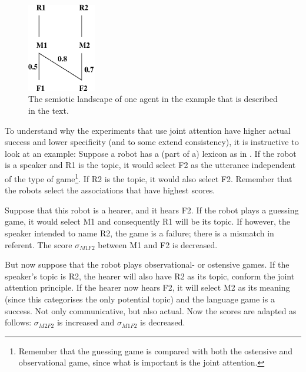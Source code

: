 \begin{figure}[t]
\centerline{\includegraphics[width=3cm]{feedback/example.eps}}
\caption{The semiotic landscape of one agent in the example that is described in the text.}
\label{f:par:example}
\end{figure}


To understand why the experiments that use joint attention have higher actual success and lower specificity (and to some extend consistency), it is instructive to look at an example: Suppose a robot has a (part of a) lexicon as in . If the robot is a speaker and R1 is the topic, it would select F2 as the utterance independent of the type of game\footnote{Remember that the guessing game is compared with both the ostensive and observational game, since what is important is the joint attention.}. If R2 is the topic, it would also select F2. Remember that the robots select the associations that have highest scores.

Suppose that this robot is a hearer, and it hears F2. If the robot plays a guessing game, it would select M1 and consequently R1 will be its topic. If however, the speaker intended to name R2, the game is a failure; there is a mismatch in referent. The score $\sigma_{M1F2}$ between M1 and F2 is decreased.

But now suppose that the robot plays observational- or ostensive games. If the speaker's topic is R2, the hearer will also have R2 as its topic, conform the joint attention principle. If the hearer now hears F2, it will select M2 as its meaning (since this categorises the only potential topic) and the language game is a success. Not only communicative, but also actual. Now the scores are adapted as follows: $\sigma_{M2F2}$ is increased and $\sigma_{M1F2}$ is decreased.

